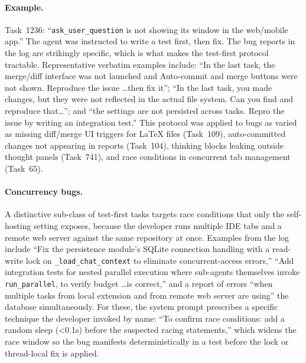 \documentclass{article}
\begin{document}
\paragraph{Example.}
Task~1236: ``\texttt{ask\_user\_question} is not showing its window
in the web/mobile app.''
The agent was instructed to write a test first, then fix.
The bug reports in the log are strikingly specific, which is what
makes the test-first protocol tractable.
Representative verbatim examples include:
``In the last task, the merge/diff interface was not launched and
Auto-commit and merge buttons were not shown.  Reproduce the issue
\ldots then fix it'';
``In the last task, you made changes, but they were not reflected
in the actual file system.  Can you find and reproduce that\ldots'';
and ``the settings are not persisted across tasks.  Repro the issue
by writing an integration test.''
This protocol was applied to bugs as varied as missing diff/merge
UI triggers for \LaTeX{} files (Task~109), auto-committed changes
not appearing in reports (Task~104), thinking blocks leaking outside
thought panels (Task~741), and race conditions in concurrent tab
management (Task~65).

\paragraph{Concurrency bugs.}
A distinctive sub-class of test-first tasks targets race conditions
that only the self-hosting setting exposes, because the developer runs
multiple IDE tabs and a remote web server against the same repository
at once.
Examples from the log include
``Fix the persistence module's SQLite connection handling with a
read-write lock on \texttt{\_load\_chat\_context} to eliminate
concurrent-access errors,''
``Add integration tests for nested parallel execution where
sub-agents themselves invoke \texttt{run\_parallel}, to verify budget
\ldots is correct,''
and a report of errors ``when multiple tasks from local extension and
from remote web server are using'' the database simultaneously.
For these, the system prompt prescribes a specific technique the
developer invoked by name: ``To confirm race conditions: add a random
sleep (\textless0.1s) before the suspected racing statements,''
which widens the race window so the bug manifests deterministically
in a test before the lock or thread-local fix is applied.
\end{document}
